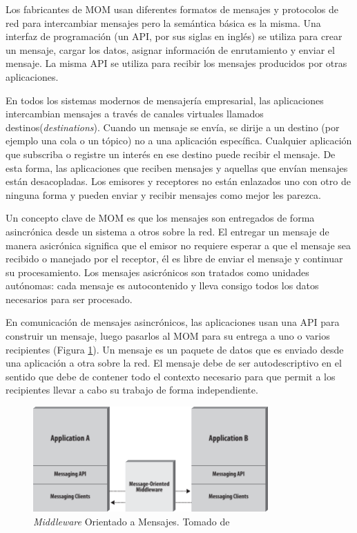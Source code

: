 \documentclass[article]{IEEEtran}
\begin{document}
Los fabricantes de MOM usan diferentes formatos de mensajes y protocolos de red para intercambiar mensajes pero la semántica básica es la misma. Una interfaz de programación (un API, por sus siglas en inglés) se utiliza para crear un mensaje, cargar los datos, asignar información de enrutamiento y enviar el mensaje. La misma API se utiliza para recibir los mensajes producidos por otras aplicaciones.

En todos los sistemas modernos de mensajería empresarial, las aplicaciones intercambian mensajes a través de canales virtuales llamados destinos(\emph{destinations}). Cuando un mensaje se envía, se dirije a un destino (por ejemplo una cola o un tópico) no a una aplicación específica. Cualquier aplicación que subscriba o registre un interés en ese destino puede recibir el mensaje. De esta forma, las aplicaciones que reciben mensajes y aquellas que envían mensajes están desacopladas. Los emisores y receptores no están enlazados uno con otro de ninguna forma y pueden enviar y recibir mensajes como mejor les parezca.

Un concepto clave de MOM es que los mensajes son entregados de forma asincrónica desde un sistema a otros sobre la red. El entregar un mensaje de manera asicrónica significa que el emisor no requiere esperar a que el mensaje sea recibido o manejado por el receptor, él es libre de enviar el mensaje y continuar su procesamiento. Los mensajes asicrónicos son tratados como unidades autónomas: cada mensaje es autocontenido y lleva consigo todos los datos necesarios para ser procesado.

En comunicación de mensajes asincrónicos, las aplicaciones usan una API para construir un mensaje, luego pasarlos al MOM para su entrega a uno o varios recipientes (Figura \ref{fig:mom}). Un mensaje es un paquete de datos que es enviado desde una aplicación a otra sobre la red. El mensaje debe de ser autodescriptivo en el sentido que debe de contener todo el contexto necesario para que permit a los recipientes llevar a cabo su trabajo de forma independiente. 

\begin{figure}[h]
  \centering
  \includegraphics[width=9cm]{jms20-mom}
  \caption{\small{\emph{Middleware} Orientado a Mensajes. Tomado de \cite{jms20}}}
  \label{fig:mom}
\end{figure}
\end{document}
